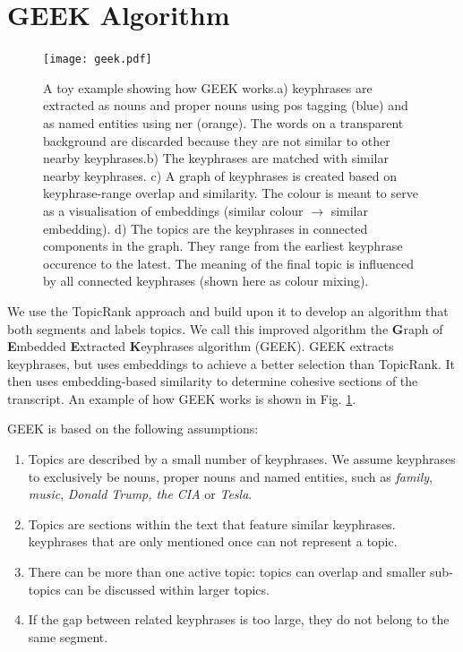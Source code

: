 \section{GEEK Algorithm}

    \begin{figure}
        \centering
        \texttt{[image: geek.pdf]}
        \caption{A toy example showing how GEEK works.\newline a) \Glspl{keyphrase} are extracted as nouns and proper nouns using \gls{pos} tagging (blue) and as named entities using \gls{ner} (orange). The words on a transparent background are discarded because they are not similar to other nearby \glspl{keyphrase}.\newline b) The \glspl{keyphrase} are matched with similar nearby \glspl{keyphrase}. \newline c) A graph of \glspl{keyphrase} is created based on \gls{keyphrase}-range overlap and similarity. The colour is meant to serve as a visualisation of embeddings (similar colour $\rightarrow$ similar embedding).\newline
        d) The topics are the \glspl{keyphrase} in connected components in the graph. They range from the earliest \gls{keyphrase} occurence to the latest. The meaning of the final topic is influenced by all connected \glspl{keyphrase} (shown here as colour mixing).
        }
        \label{fig:geek architecture}
    \end{figure}

We use the TopicRank approach and build upon it to develop an algorithm that both segments and labels topics. We call this improved algorithm the \textbf{G}raph of \textbf{E}mbedded \textbf{E}xtracted \textbf{K}eyphrases algorithm (GEEK). GEEK extracts \glspl{keyphrase}, but uses \glspl{embedding} to achieve a better selection than TopicRank. It then uses embedding-based similarity to determine cohesive sections of the transcript. An example of how GEEK works is shown in Fig. \ref{fig:geek architecture}.

GEEK is based on the following assumptions:

\begin{enumerate}
    \item Topics are described by a small number of \glspl{keyphrase}. We assume \glspl{keyphrase} to exclusively be nouns, proper nouns and named entities, such as \textit{family}, \textit{music}, \textit{Donald Trump, the CIA} or \textit{Tesla}.
    \item Topics are sections within the text that feature similar \glspl{keyphrase}. \glspl{keyphrase} that are only mentioned once can not represent a topic.
    \item There can be more than one active topic: topics can overlap and smaller sub-topics can be discussed within larger topics.
    \item If the gap between related \glspl{keyphrase} is too large, they do not belong to the same segment.
\end{enumerate}

